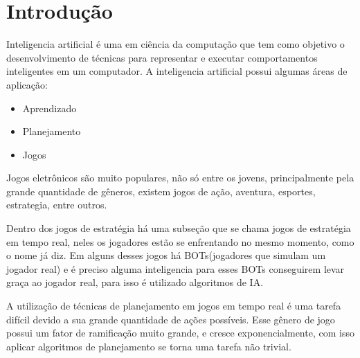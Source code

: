 \chapter{\label{chap:intro}Introdução}



Inteligencia artificial é uma em ciência da computação que tem como objetivo o desenvolvimento de técnicas para representar e executar comportamentos inteligentes em um computador. 
A inteligencia artificial possui algumas áreas de aplicação: 
\begin{itemize}
	\item Aprendizado
	\item Planejamento
	\item Jogos
\end{itemize}

Jogos eletrônicos são muito populares, não só entre os jovens, principalmente pela grande quantidade de gêneros, existem jogos de ação, aventura, esportes, estrategia, entre outros. 


Dentro dos jogos de estratégia há uma subseção que se chama jogos de estratégia em tempo real, neles os jogadores estão se enfrentando no mesmo momento, como o nome já diz. 
Em alguns desses jogos há BOTs(jogadores que simulam um jogador real) e é preciso alguma inteligencia para esses BOTs conseguirem levar graça ao jogador real, para isso é utilizado algoritmos de IA. 

A utilização de técnicas de planejamento em jogos em tempo real é uma tarefa difícil devido a sua grande quantidade de ações possíveis. 
Esse gênero de jogo possui um fator de ramificação muito grande, e cresce exponencialmente, com isso aplicar algoritmos de planejamento se torna uma tarefa não trivial. 


